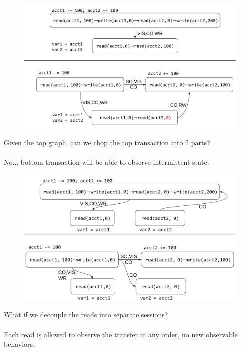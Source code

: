 \documentclass{beamer}
\begin{document}
\begin{frame}
	\begin{figure}
		\includegraphics[scale=0.15]{chopping1}
	\end{figure}
	\begin{example}
		Given the top graph, can we chop the top transaction into 2 parts? \\
		\hfill \\
		No... bottom transaction will be able to observe intermittent state.
	\end{example}
\end{frame}

\begin{frame}
	\begin{figure}
		\includegraphics[scale=0.15]{chopping2}
	\end{figure}
	\begin{example}
		What if we decouple the reads into separate sessions? \\
		\hfill \\
		Each read is allowed to observe the transfer in any order, no new observable behaviors.
	\end{example}
\end{frame}
\end{document}
